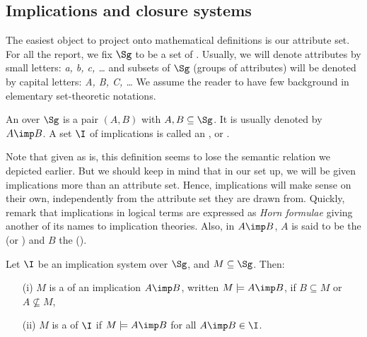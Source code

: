 
\subsection{Implications and closure systems}

The easiest object to project onto mathematical definitions is our attribute
set. For all the report, we fix $\Sg$ to be a set of . 
Usually, we will denote attributes by small letters: \textit{a, b, c, \dots} 
and subsets of $\Sg$ (groups of attributes) will be denoted by capital letters: 
\textit{A, B, C, \dots} We assume the reader to have few background in 
elementary set-theoretic notations. 

\begin{definition} An 
 over $\Sg$ is a pair $(A, B)$ with $A, B \subseteq \Sg$. 
It is usually denoted by $A \imp B$. A set $\I$ of implications is called an 
,  or 
.
\end{definition}

\noindent Note that given as is, this definition seems to lose the semantic
relation we depicted earlier. But we should keep in mind that in our set up, we
will be given implications more than an attribute set. Hence, implications will
make sense on their own, independently from the attribute set they are drawn 
from. Quickly, remark that implications in logical terms are expressed as
\textit{Horn formulae} giving another of its names to implication theories. 
Also, in $A \imp B$, $A$ is said to be the  (or ) 
and $B$ the  ().

\begin{definition} Let $\I$ be an implication system over 
	$\Sg$, and $M \subseteq \Sg$. Then:
	\begin{itemize}
		\item[(i)] $M$ is a  of an implication $A \imp B$, 
		written 
		$M \models A \imp B$, if $B \subseteq M$ or $A \nsubseteq M$,
		\item[(ii)] $M$ is a  of $\I$ if $M \models A \imp B$ for 
		all
		$A \imp B \in \I$.
	\end{itemize}
	
\end{definition}

